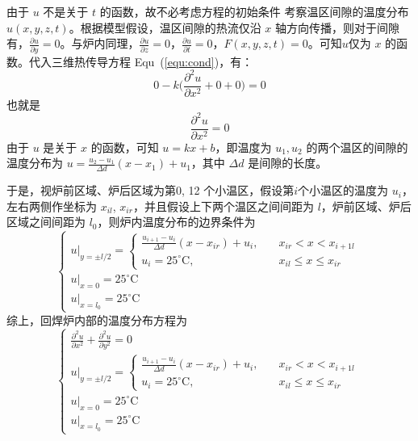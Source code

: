 \documentclass[../main.tex]{subfiles}
\begin{document}
由于 \(u\) 不是关于 \(t\) 的函数，故不必考虑方程的初始条件
考察温区间隙的温度分布 \(u (x,  y , z ,t)\)。根据模型假设，温区间隙的热流仅沿 \(x\) 轴方向传播，则对于间隙有，\(\frac{\partial u}{\partial y} = 0\)。与炉内同理，\(\frac{\partial u}{ \partial z} = 0\)，\(\frac{\partial u}{\partial t} = 0\)，\(F(x, y , z,t) = 0\)。可知\(u\)仅为 \(x\) 的函数。代入三维热传导方程 Equ~(\ref{equ:cond})，有：
\begin{equation}
0 - k \bigg( \frac{\partial ^{2} u}{ \partial x ^{2}} + 0 + 0\bigg) = 0
\end{equation}
也就是
\begin{equation}
\frac{\partial ^{2} u}{\partial x ^{2}} = 0
\end{equation}
由于 \(u\) 是关于 \(x\) 的函数，可知 \(u = kx + b\)，即温度为 \(u_{1} , u_2\) 的两个温区的间隙的温度分布为 \(u = \displaystyle \frac{u_2 - u_1}{\varDelta d} ( x - x_1) + u_1\)，其中 \(\varDelta d\) 是间隙的长度。

于是，视炉前区域、炉后区域为第\(0\), 12 个小温区，假设第\(i\)个小温区的温度为 \(u_{i}\)，左右两侧作坐标为 \(x_{il}\), \(x_{ir}\)，并且假设上下两个温区之间间距为 \(l\)，炉前区域、炉后区域之间间距为 \(l_{0}\)，则炉内温度分布的边界条件为
\begin{equation}
\begin{cases}
u|_{y = \pm l/2} =
\begin{cases}
\frac{u_{i+1} - u_{i}}{\varDelta d} (x - x_{ir}) + u_{i} , & \quad x _{ir} < x < x_{i+1 l} \\
u_{i} = 25 ^{\circ}\mathrm{C}, & \quad  x_{il} \le x \le x_{ir}
\end{cases} \\
u|_{x = 0} = 25 ^{\circ}\mathrm{C}\\
u|_{x = l_{0}} =  25 ^{\circ}\mathrm{C}
\end{cases}
\end{equation}
综上，回焊炉内部的温度分布方程为
\begin{equation}
\begin{cases}
\displaystyle\frac{\partial ^{2} u}{\partial x ^2} + \frac{\partial ^{2} u}{\partial y ^{2}} = 0\\
u|_{y = \pm l/2} =
\begin{cases}
\displaystyle\frac{u_{i+1} - u_{i}}{\varDelta d} (x - x_{ir}) + u_{i} , & \quad x _{ir} < x < x_{i+1 l} \\
\displaystyle u_{i} = 25 ^{\circ}\mathrm{C}, & \quad  x_{il} \le x \le x_{ir}
\end{cases} \\
u|_{x = 0} = 25 ^{\circ}\mathrm{C}\\
u|_{x = l_{0}} =  25 ^{\circ}\mathrm{C}
\end{cases}
\end{equation}
\end{document}

